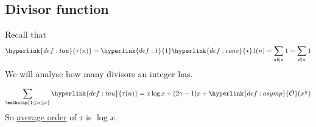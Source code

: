 \documentclass{article}
\newcommand{\1}{\mathbbm{1}}
\newcommand{\bigO}{\mathcal{O}}
\begin{document}
\subsection{Divisor function}
Recall that
\begin{equation*}
\hyperlink{def:tau}{\tau(n)} = \hyperlink{def:1}{1} \hyperlink{def:conv}{\star} 1 (n) = \sum_{ab \mid n} 1 = \sum_{d \mid n} 1
\end{equation*}
We will analyse how many divisors an integer has.
\begin{nthm}\label{thm:4}
  \begin{align*}
    \sum_{\mathclap{1 \leq n \leq x}} \hyperlink{def:tau}{\tau(n)} = x \log x + (2 \gamma - 1) x + \hyperlink{def:asymp}{\bigO}(x^{\frac{1}{2}})
  \end{align*}
  So \hyperlink{def:averageOrder}{average order} of $\tau$ is $\log x$.
\end{nthm}
\end{document}
